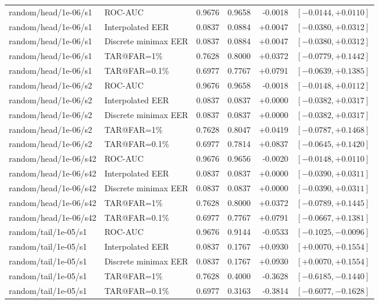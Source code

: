 \begin{table}[!t]
\begin{tabular}{@{}llrrrr@{}}
random/head/1e-06/s1 & ROC-AUC & 0.9676 & 0.9658 & -0.0018 & $[-0.0144,+0.0110]$ \\
random/head/1e-06/s1 & Interpolated EER & 0.0837 & 0.0884 & +0.0047 & $[-0.0380,+0.0312]$ \\
random/head/1e-06/s1 & Discrete minimax EER & 0.0837 & 0.0884 & +0.0047 & $[-0.0380,+0.0312]$ \\
random/head/1e-06/s1 & TAR@FAR=1\% & 0.7628 & 0.8000 & +0.0372 & $[-0.0779,+0.1442]$ \\
random/head/1e-06/s1 & TAR@FAR=0.1\% & 0.6977 & 0.7767 & +0.0791 & $[-0.0639,+0.1385]$ \\
random/head/1e-06/s2 & ROC-AUC & 0.9676 & 0.9658 & -0.0018 & $[-0.0148,+0.0112]$ \\
random/head/1e-06/s2 & Interpolated EER & 0.0837 & 0.0837 & +0.0000 & $[-0.0382,+0.0317]$ \\
random/head/1e-06/s2 & Discrete minimax EER & 0.0837 & 0.0837 & +0.0000 & $[-0.0382,+0.0317]$ \\
random/head/1e-06/s2 & TAR@FAR=1\% & 0.7628 & 0.8047 & +0.0419 & $[-0.0787,+0.1468]$ \\
random/head/1e-06/s2 & TAR@FAR=0.1\% & 0.6977 & 0.7814 & +0.0837 & $[-0.0645,+0.1420]$ \\
random/head/1e-06/s42 & ROC-AUC & 0.9676 & 0.9656 & -0.0020 & $[-0.0148,+0.0110]$ \\
random/head/1e-06/s42 & Interpolated EER & 0.0837 & 0.0837 & +0.0000 & $[-0.0390,+0.0311]$ \\
random/head/1e-06/s42 & Discrete minimax EER & 0.0837 & 0.0837 & +0.0000 & $[-0.0390,+0.0311]$ \\
random/head/1e-06/s42 & TAR@FAR=1\% & 0.7628 & 0.8000 & +0.0372 & $[-0.0789,+0.1445]$ \\
random/head/1e-06/s42 & TAR@FAR=0.1\% & 0.6977 & 0.7767 & +0.0791 & $[-0.0667,+0.1381]$ \\
random/tail/1e-05/s1 & ROC-AUC & 0.9676 & 0.9144 & -0.0533 & $[-0.1025,-0.0096]$ \\
random/tail/1e-05/s1 & Interpolated EER & 0.0837 & 0.1767 & +0.0930 & $[+0.0070,+0.1554]$ \\
random/tail/1e-05/s1 & Discrete minimax EER & 0.0837 & 0.1767 & +0.0930 & $[+0.0070,+0.1554]$ \\
random/tail/1e-05/s1 & TAR@FAR=1\% & 0.7628 & 0.4000 & -0.3628 & $[-0.6185,-0.1440]$ \\
random/tail/1e-05/s1 & TAR@FAR=0.1\% & 0.6977 & 0.3163 & -0.3814 & $[-0.6077,-0.1628]$ \\

\end{tabular}
\end{table}
